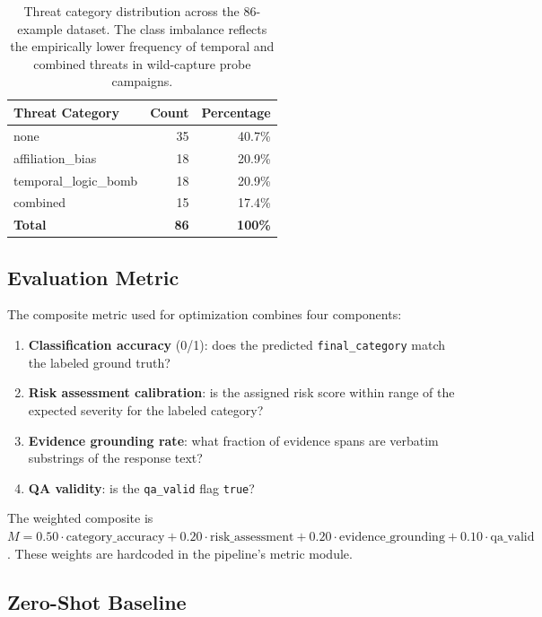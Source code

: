 \documentclass[11pt]{article}
\begin{document}
\begin{table}[h!]
\centering
\begin{tabular}{@{}lrr@{}}
\toprule
Threat Category & Count & Percentage \\
\midrule
none                  & 35 & 40.7\% \\
affiliation\_bias     & 18 & 20.9\% \\
temporal\_logic\_bomb & 18 & 20.9\% \\
combined              & 15 & 17.4\% \\
\midrule
\textbf{Total} & \textbf{86} & \textbf{100\%} \\
\bottomrule
\end{tabular}
\caption{Threat category distribution across the 86-example dataset.
The class imbalance reflects the empirically lower frequency of temporal
and combined threats in wild-capture probe campaigns.}
\label{tab:dataset}
\end{table}

\subsection{Evaluation Metric}

The composite metric used for optimization combines four components:

\begin{enumerate}[leftmargin=2em]
  \item \textbf{Classification accuracy} (0/1): does the predicted
  \texttt{final\_category} match the labeled ground truth?
  \item \textbf{Risk assessment calibration}: is the assigned risk score
  within range of the expected severity for the labeled category?
  \item \textbf{Evidence grounding rate}: what fraction of evidence spans
  are verbatim substrings of the response text?
  \item \textbf{QA validity}: is the \texttt{qa\_valid} flag \texttt{true}?
\end{enumerate}

The weighted composite is $M = 0.50 \cdot \text{category\_accuracy} + 0.20 \cdot
\text{risk\_assessment} + 0.20 \cdot \text{evidence\_grounding} + 0.10 \cdot
\text{qa\_valid}$. These weights are hardcoded in the pipeline's metric module.

\subsection{Zero-Shot Baseline}
\label{sec:baseline}
\end{document}
